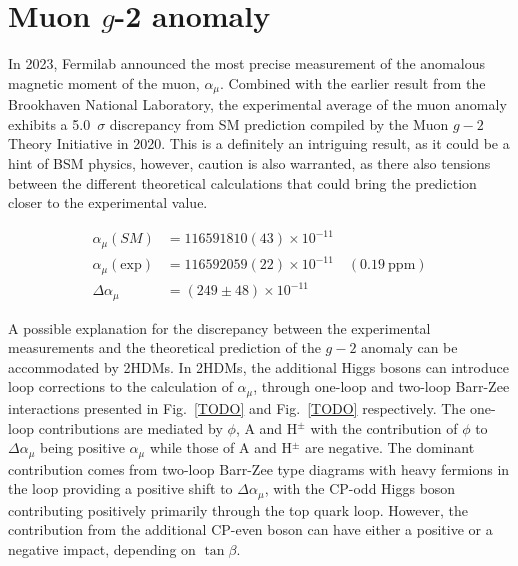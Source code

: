 \section{\texorpdfstring{Muon $g$-2 anomaly}{Muon g-2 anomaly}}

In 2023, Fermilab announced the most precise measurement of the anomalous magnetic moment of the muon, $\alpha_\mu$. Combined with the earlier result from the Brookhaven National Laboratory, the experimental average of the muon anomaly exhibits a 5.0~$\sigma$ discrepancy from SM prediction compiled by the Muon $g-2$ Theory Initiative in 2020. This is a definitely an intriguing result, as it could be a hint of BSM physics, however, caution is also warranted, as there also tensions between the different theoretical calculations that could bring the prediction closer to the experimental value.


\begin{equation}
\begin{aligned}
    \alpha_\mu (SM) &= 116591810(43) \times 10^{-11} \\
    \alpha_\mu (\text{exp}) &= 116592059(22) \times 10^{-11} \quad (0.19~\text{ppm}) \\
    \Delta \alpha_\mu &= (249\pm48) \times 10^{-11}
\end{aligned}
\end{equation}

A possible explanation for the discrepancy between the experimental measurements and the theoretical prediction of the $g-2$ anomaly can be accommodated by 2HDMs. In 2HDMs, the additional Higgs bosons can introduce loop corrections to the calculation of $\alpha_\mu$, through one-loop and two-loop Barr-Zee interactions presented in Fig.~\ref{TODO} and Fig.~\ref{TODO} respectively. The one-loop contributions are mediated by $\phi$, A and H$^{\pm}$ with the contribution of $\phi$ to $\Delta\alpha_\mu$ being positive $\alpha_\mu$ while those of A and H$^{\pm}$ are negative. The dominant contribution comes from two-loop Barr-Zee type diagrams with heavy fermions in the loop providing a positive shift to $\Delta\alpha_\mu$, with the CP-odd Higgs boson contributing positively primarily through the top quark loop. However, the contribution from the additional CP-even boson can have either a positive or a negative impact, depending on $\tan{\beta}$. 


